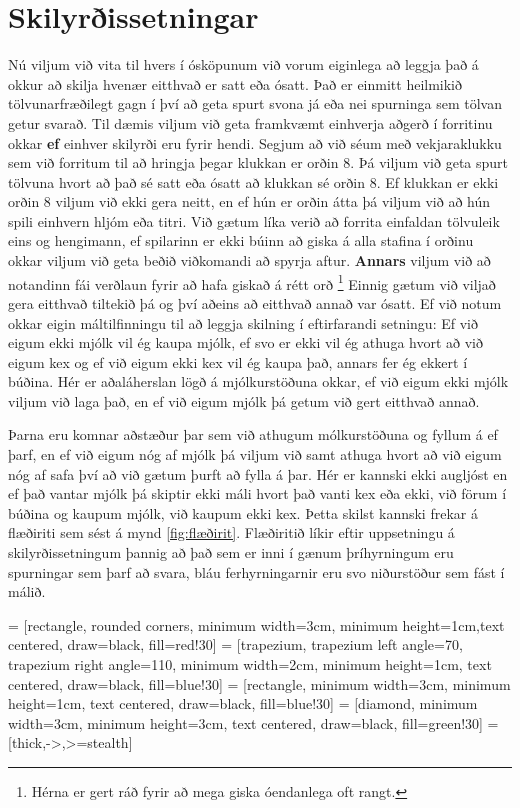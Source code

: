 \section{Skilyrðissetningar}
Nú viljum við vita til hvers í ósköpunum við vorum eiginlega að leggja það á okkur að skilja hvenær eitthvað er satt eða ósatt.
Það er einmitt heilmikið tölvunarfræðilegt gagn í því að geta spurt svona já eða nei spurninga sem tölvan getur svarað.
Til dæmis viljum við geta framkvæmt einhverja aðgerð í forritinu okkar \textbf{ef} einhver skilyrði eru fyrir hendi.
Segjum að við séum með vekjaraklukku sem við forritum til að hringja þegar klukkan er orðin 8.
Þá viljum við geta spurt tölvuna hvort að það sé satt eða ósatt að klukkan sé orðin 8.
Ef klukkan er ekki orðin 8 viljum við ekki gera neitt, en ef hún er orðin átta þá viljum við að hún spili einhvern hljóm eða titri.
Við gætum líka verið að forrita einfaldan tölvuleik eins og hengimann, ef spilarinn er ekki búinn að giska á alla stafina í orðinu okkar viljum við geta beðið viðkomandi að spyrja aftur.
\textbf{Annars} viljum við að notandinn fái verðlaun fyrir að hafa giskað á rétt orð \footnote{Hérna er gert ráð fyrir að mega giska óendanlega oft rangt.}
Einnig gætum við viljað gera eitthvað tiltekið þá og því aðeins að eitthvað annað var ósatt.
Ef við notum okkar eigin máltilfinningu til að leggja skilning í eftirfarandi setningu: Ef við eigum ekki mjólk vil ég kaupa mjólk, ef svo er ekki vil ég athuga hvort að við eigum kex og ef við eigum ekki kex vil ég kaupa það, annars fer ég ekkert í búðina.
Hér er aðaláherslan lögð á mjólkurstöðuna okkar, ef við eigum ekki mjólk viljum við laga það, en ef við eigum mjólk þá getum við gert eitthvað annað.

Þarna eru komnar aðstæður þar sem við athugum mólkurstöðuna og fyllum á ef þarf, en ef við eigum nóg af mjólk þá viljum við samt athuga hvort að við eigum nóg af safa því að við gætum þurft að fylla á þar.
Hér er kannski ekki augljóst en ef það vantar mjólk þá skiptir ekki máli hvort það vanti kex eða ekki, við förum í búðina og kaupum mjólk, við kaupum ekki kex.
Þetta skilst kannski frekar á flæðiriti sem sést á mynd \ref{fig:flæðirit}.
Flæðiritið líkir eftir uppsetningu á skilyrðissetningum þannig að það sem er inni í gænum þríhyrningum eru spurningar sem þarf að svara, bláu ferhyrningarnir eru svo niðurstöður sem fást í málið.

 = [rectangle, rounded corners, minimum width=3cm, minimum height=1cm,text centered, draw=black, fill=red!30]
 = [trapezium, trapezium left angle=70, trapezium right angle=110, minimum width=2cm, minimum height=1cm, text centered, draw=black, fill=blue!30]
 = [rectangle, minimum width=3cm, minimum height=1cm, text centered, draw=black, fill=blue!30]
 = [diamond, minimum width=3cm, minimum height=3cm, text centered, draw=black, fill=green!30]
 = [thick,->,>=stealth]


